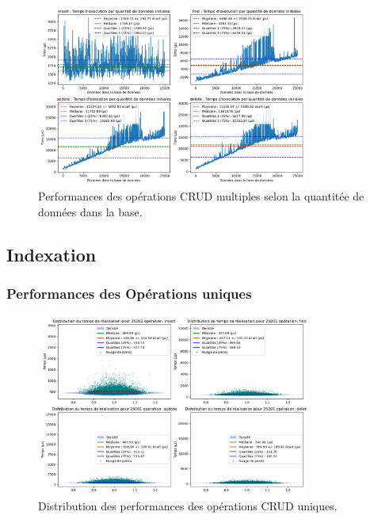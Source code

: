 \documentclass[12pt,a4paper]{report}
\begin{document}
        \begin{figure}[H]
            \centering
            \includegraphics[width=0.8\textwidth]{../plots/MySQL/sharding/test_many_various_data.png}
            \caption{Performances des opérations CRUD multiples selon la quantitée de données dans la base.}
            \label{fig:mysql_cluster_many_various}
        \end{figure}

        \subsection{Indexation}
        
            \subsubsection{Performances des Opérations uniques}

                \begin{figure}[H]
                    \centering
                    \includegraphics[width=0.8\textwidth]{../plots/MySQL/sharding_indexed/global_test_one.png}
                    \caption{Distribution des performances des opérations CRUD uniques.}
                    \label{fig:mysql_cluster_global_one_indexed}
                \end{figure}
\end{document}
